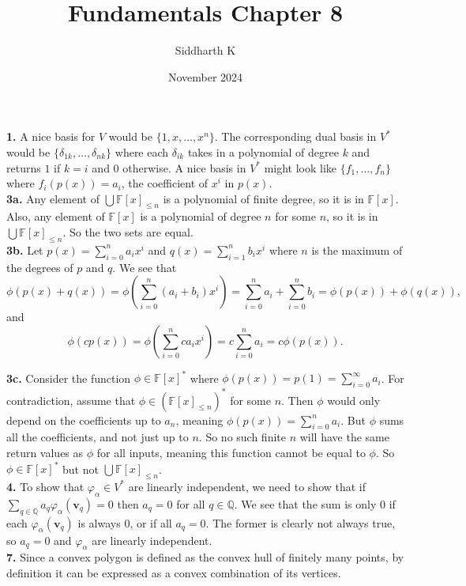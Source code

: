 \documentclass{article}
\title{Fundamentals Chapter 8}
\author{Siddharth K}
\date{November 2024}
\newcommand{\bv}{\mathbf{v}}
\newcommand{\Q}{\mathbb{Q}}
\newcommand{\F}{\mathbb{F}}
\begin{document}
\maketitle

\textbf{1.} A nice basis for $V$ would be $\{1, x, \ldots, x^n\}$. The corresponding dual basis in $V^*$ would be $\{\delta_{1k}, \ldots, \delta_{nk}\}$ where each $\delta_{ik}$ takes in a polynomial of degree $k$ and returns $1$ if $k = i$ and $0$ otherwise. A nice basis in $V^*$ might look like $\{f_1, \ldots, f_n\}$ where $f_i(p(x)) = a_i$, the coefficient of $x^i$ in $p(x)$. \\

\textbf{3a.} Any element of $\bigcup \F[x]_{\le n}$ is a polynomial of finite degree, so it is in $\F[x]$. Also, any element of $\F[x]$ is a polynomial of degree $n$ for some $n$, so it is in $\bigcup \F[x]_{\le n}$. So the two sets are equal. \\

\textbf{3b.} Let $p(x) = \sum_{i = 0}^n a_ix^i$ and $q(x) = \sum_{i = 1}^n b_ix^i$ where $n$ is the maximum of the degrees of $p$ and $q$. We see that
$$\phi(p(x) + q(x)) = \phi\left(\sum_{i = 0}^n (a_i + b_i)x^i\right) = \sum_{i = 0}^n a_i + \sum_{i = 0}^n b_i = \phi(p(x)) + \phi(q(x)),$$
and
$$\phi(cp(x)) = \phi\left(\sum_{i = 0}^n ca_ix^i\right) = c\sum_{i = 0}^n a_i = c\phi(p(x)).$$

\textbf{3c.} Consider the function $\phi \in \F[x]^*$ where $\phi(p(x)) = p(1) = \sum_{i = 0}^\infty a_i$. For contradiction, assume that $\phi \in (\F[x]_{\le n})^*$ for some $n$. Then $\phi$ would only depend on the coefficients up to $a_n$, meaning $\phi(p(x)) = \sum_{i = 0}^n a_i$. But $\phi$ sums all the coefficients, and not just up to $n$. So no such finite $n$ will have the same return values as $\phi$ for all inputs, meaning this function cannot be equal to $\phi$. So $\phi \in \F[x]^*$ but not $\bigcup \F[x]_{\le n}$. \\

\textbf{4.} To show that $\varphi_\alpha \in V^*$ are linearly independent, we need to show that if $\sum_{q \in \Q} a_q\varphi_\alpha(\bv_q) = 0$ then $a_q = 0$ for all $q \in \Q$. We see that the sum is only $0$ if each $\varphi_\alpha(\bv_q)$ is always $0$, or if all $a_q = 0$. The former is clearly not always true, so $a_q = 0$ and $\varphi_\alpha$ are linearly independent. \\

\textbf{7.} Since a convex polygon is defined as the convex hull of finitely many points, by definition it can be expressed as a convex combination of its vertices. \\
\end{document}
